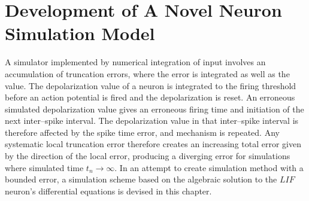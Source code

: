 \documentclass[b5paper,12 pt]{report}
\begin{document}
\chapter{Development of A Novel Neuron Simulation Model}
	\label{chapDevelopmentOfANovelModel}

A simulator implemented by numerical integration of input involves an accumulation of truncation errors, where the error is integrated as well as the value. %
The depolarization value of a neuron is integrated to the firing threshold before an action potential is fired and the depolarization is reset. %
An erroneous simulated depolarization value gives an erroneous firing time and initiation of the next inter--spike interval.
The depolarization value in that inter--spike interval is therefore affected by the spike time error, and mechanism is repeated.
Any systematic local truncation error therefore creates an increasing total error given by the direction of the local error, producing a diverging error for simulations where simulated time $t_n \to \infty$.
In an attempt to create simulation method with a bounded error, a simulation scheme based on the algebraic solution to the $LIF$ neuron's differential equations is devised in this chapter.
\end{document}
